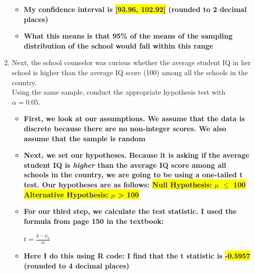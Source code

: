 \documentclass[12pt,letterpaper]{article}
\begin{document}
\begin{enumerate}
\begin{itemize}
			
			
			\item \textbf{My confidence interval is \colorbox{yellow}{[93.96, 102.92]} (rounded to 2 decimal places)}
			
			\item \textbf{What this means is that 95\% of the means of the sampling distribution of the school would fall within this range}
		\end{itemize} 
		
		
		
	

	
	\item Next, the school counselor was curious  whether  the average student IQ in her school is higher than the average IQ score (100) among all the schools in the country.\\ 
	
	\noindent Using the same sample, conduct the appropriate hypothesis test with $\alpha=0.05$.
	
	\begin{itemize}
		\item \textbf{First, we look at our assumptions. We assume that the data is discrete because there are no non-integer scores. We also assume that the sample is random}
		
		\item \textbf{Next, we set our hypotheses. Because it is asking if the average student IQ is \textit{higher} than the average IQ score among all schools in the country, we are going to be using a one-tailed t test. Our hypotheses are as follows:
		\newline \colorbox{yellow}{Null Hypothesis: $\mu$ $\le$ 100}
		\newline 
		\colorbox{yellow}{Alternative Hypothesis: $\mu$ > 100} }
		
		\item \textbf{For our third step, we calculate the test statistic. I used the formula from page 150 in the textbook:} \\
		\vspace{-0.5cm}
				
			\begin{center} \begin{LARGE}
					{
				$ t = \frac{\bar{y} - \mu_{0}}{\textit{se}}$} 
			\end{LARGE}
			\end{center}
			
		\item \textbf{Here I do this using R code: I find that the t statistic is \colorbox{yellow}{-0.5957} (rounded to 4 decimal places)}
		

\end{itemize}
\end{enumerate}
\end{document}

